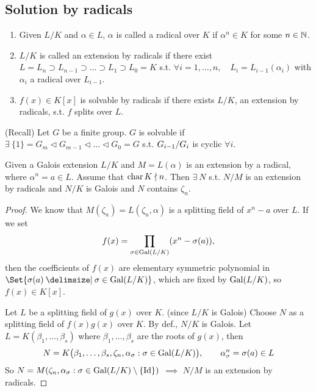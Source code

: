 \subsection{Solution by radicals}

\begin{definition} \mbox{}
  \begin{enumerate}
    \item Given $L/K$ and $\alpha \in L$, $\alpha$ is called a radical over $K$
      if $\alpha^n \in K$ for some $n\in \mathbb{N}$.
    \item $L/K$ is called an extension by radicals if there exist
      $L = L_n \supset L_{n-1} \supset \dots \supset L_1 \supset L_0 = K$
      s.t. $\forall i = 1,\dots, n, \quad L_i = L_{i-1}(\alpha_i)$ with
      $\alpha_i$ a radical over $L_{i-1}$.
    \item $f(x) \in K[x]$ is solvable by radicals if there exists $L/K$,
      an extension by radicals, s.t. $f$ splits over $L$.
  \end{enumerate}
\end{definition}

\begin{definition}
  (Recall) Let $G$ be a finite group. $G$ is solvable if
  $\exists\: \{1\} = G_m \lhd G_{m-1} \lhd \dots \lhd G_0 = G$ s.t.
  ${G_{i-1}}/{G_i}$ is cyclic $\forall i$.
\end{definition}


\begin{lemma} \label{lemma:galois-radical-ext}
  Given a Galois extension $L/K$ and $M = L(\alpha)$ is an extension by
  a radical, where $\alpha^n = a \in L$. Assume that $\operatorname{char} K \nmid n$. Then
  $\exists\: N$ s.t. $N/M$ is an extension by radicals and $N/K$ is Galois
  and $N$ contains $\zeta_n$.
  \begin{proof}
    We know that $M(\zeta_n) = L(\zeta_n, \alpha)$ is a splitting field of
    $x^n - a$ over $L$. If we set
    \[ f(x) = \prod_{\sigma \in \operatorname{Gal}(L/K)} (x^n - \sigma(a)), \]
    then the coefficients of $f(x)$ are elementary symmetric polynomial in
    $\Set{\sigma(a) \given \sigma \in \Gal(L/K) }$, which are fixed by
    $\operatorname{Gal}(L/K)$, so $f(x) \in K[x]$.

    Let $L$ be a splitting field of $g(x)$ over $K$. (since $L/K$ is Galois)
    Choose $N$ as a splitting field of $f(x)g(x)$ over $K$.
    By def., $N/K$ is Galois. Let $L = K(\beta_1,\dots,\beta_s)$ where
    $\beta_1, \dots, \beta_s$ are the roots of $g(x)$, then
    \[
      N = K\big(\beta_1,\dots,\beta_s, \zeta_n,
        \alpha_\sigma : \sigma \in \operatorname{Gal}(L/K)
      \big),
      \qquad \alpha_\sigma^n = \sigma(a) \in L
    \]
    So $N = M(\zeta_n, \alpha_\sigma : \sigma \in \operatorname{Gal}(L/K) \setminus \{ {\rm Id} \})$
    $\implies$ $N/M$ is an extension by radicals.
  \end{proof}
\end{lemma}

